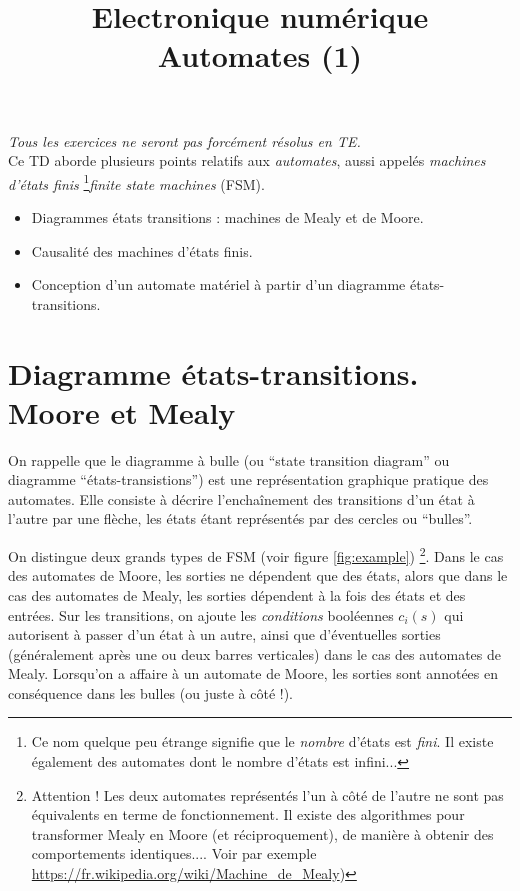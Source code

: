 \documentclass[a4paper,11pt]{article}
\title{{\Huge Electronique numérique}\\Automates (1)}
\date{}
\begin{document}
\maketitle
{\it Tous les exercices ne seront pas forcément résolus en TE.}\\

Ce TD aborde plusieurs points relatifs aux {\it automates}, aussi appelés {\it machines d'états finis}
\footnote{Ce nom quelque peu étrange signifie que le {\it nombre} d'états est {\it fini}. Il existe également
des automates dont le nombre d'états est infini...}{\it finite state machines} (FSM).
\begin{itemize}
  \item Diagrammes états transitions : machines de Mealy et de Moore.
  \item Causalité des machines d'états finis.
  \item Conception d'un automate matériel à partir d'un diagramme  états-transitions.
\end{itemize}


\section{Diagramme états-transitions. Moore et Mealy}
On rappelle que le diagramme à bulle (ou ``state transition diagram'' ou diagramme ``états-transistions'') est une représentation graphique pratique des automates.
Elle consiste à décrire l'enchaînement des transitions d'un état à l'autre par une flèche,
les états étant représentés par des cercles ou ``bulles''.

On distingue deux grands types de FSM (voir figure \ref{fig:example}) \footnote{Attention !
Les deux automates représentés l'un à côté de l'autre ne sont pas équivalents en terme de fonctionnement.
Il existe des algorithmes pour transformer Mealy en Moore (et réciproquement), de manière à obtenir des
comportements identiques.... Voir par exemple \url{https://fr.wikipedia.org/wiki/Machine_de_Mealy})}. Dans le cas des automates de Moore, les sorties ne dépendent que des états, alors que dans le cas des automates de Mealy,
les sorties dépendent à la fois des états et des entrées. Sur les transitions, on ajoute les {\it conditions} booléennes $c_i(s)$ qui autorisent à passer d'un état à un autre, ainsi
que d'éventuelles sorties (généralement après une ou deux barres verticales) dans le cas des automates de Mealy. Lorsqu'on a affaire à un automate de Moore, les sorties sont annotées en
conséquence dans les bulles (ou juste à côté !).\\
\end{document}
